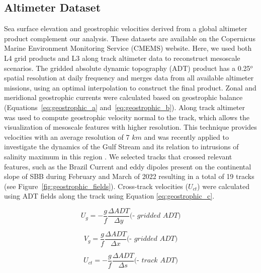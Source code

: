 \documentclass[draft]{agujournal2019}
\begin{document}
\subsection{Altimeter Dataset}
Sea surface elevation and geostrophic velocities derived from a global altimeter product complement our analysis. These datasets are available on the Copernicus Marine Environment Monitoring Service (CMEMS) website. Here, we used both L4 grid products \cite{cmems_l4_ssh_nrt} and L3 along track altimeter data \cite{cmems_l3_ssh_reprocessed} to reconstruct mesoscale scenarios. The gridded absolute dynamic topography (ADT) product has a 0.25$^o$ spatial resolution at daily frequency and merges data from all available altimeter missions, using an optimal interpolation to construct the final product. Zonal and meridional geostrophic currents were calculated based on geostrophic balance (Equations~\ref{eq:geostrophic_a} and~\ref{eq:geostrophic_b}). Along track altimeter was used to compute geostrophic velocity normal to the track, which allows the visualization  of mesoscale features with higher resolution. This technique provides velocities with an average resolution of 7 $km$ and was recently applied to investigate the dynamics of the Gulf Stream and its relation to intrusions of salinity maximum in this region \cite{silver2022spatial}. We selected tracks that crossed relevant features, such as the Brazil Current and eddy dipoles present on the continental slope of SBB during February and March of 2022 resulting in a total of 19 tracks (see Figure~\ref{fig:geostrophic_fields}). Cross-track velocities ($U_{ct}$) were calculated using ADT fields along the track using Equation \ref{eq:geostrophic_c}.

\begin{linenomath*}

\begin{equation}
\label{eq:geostrophic_a}
U_{g}  = - \frac{g}{f} \frac{\Delta{ADT}}{\Delta y} {\textit{(- gridded ADT)}}
\end{equation}

\begin{equation}
\label{eq:geostrophic_b}
V_{g}  = \frac{g}{f} \frac{\Delta{ADT}}{\Delta x} {\textit{(- gridded ADT)}}
\end{equation}

\begin{equation}
\label{eq:geostrophic_c}
U_{ct}  = - \frac{g}{f} \frac{\Delta{ADT}}{\Delta s} {\textit{(- track ADT)}}
\end{equation}
\end{linenomath*}
\end{document}
